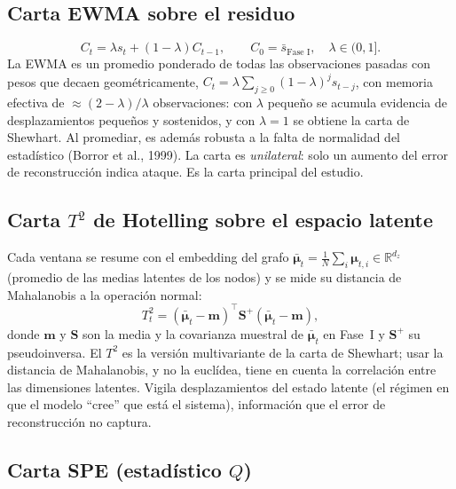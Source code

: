 \documentclass[11pt,a4paper]{article}
\newcommand{\R}{\mathbb{R}}
\begin{document}
\subsection{Carta EWMA sobre el residuo}

\begin{equation}
C_t=\lambda s_t+(1-\lambda)C_{t-1},\qquad C_0=\bar s_{\text{Fase I}},\quad \lambda\in(0,1].
\end{equation}
La EWMA es un promedio ponderado de todas las observaciones pasadas con pesos que
decaen geométricamente, $C_t=\lambda\sum_{j\ge0}(1-\lambda)^j s_{t-j}$, con memoria
efectiva de $\approx(2-\lambda)/\lambda$ observaciones: con $\lambda$ pequeño se
acumula evidencia de desplazamientos pequeños y sostenidos, y con $\lambda=1$ se
obtiene la carta de Shewhart. Al promediar, es además robusta a la falta de
normalidad del estadístico (Borror et al., 1999). La carta es \emph{unilateral}: solo
un aumento del error de reconstrucción indica ataque. Es la carta principal del
estudio.

\subsection{Carta $T^2$ de Hotelling sobre el espacio latente}

Cada ventana se resume con el embedding del grafo
$\bar{\bm\mu}_t=\frac1N\sum_i\bm\mu_{t,i}\in\R^{d_z}$ (promedio de las medias
latentes de los nodos) y se mide su distancia de Mahalanobis a la operación normal:
\begin{equation}
T^2_t=(\bar{\bm\mu}_t-\mathbf{m})^\top\mathbf{S}^{+}(\bar{\bm\mu}_t-\mathbf{m}),
\end{equation}
donde $\mathbf{m}$ y $\mathbf{S}$ son la media y la covarianza muestral de
$\bar{\bm\mu}_t$ en Fase~I y $\mathbf{S}^{+}$ su pseudoinversa. El $T^2$ es la
versión multivariante de la carta de Shewhart; usar la distancia de Mahalanobis, y no
la euclídea, tiene en cuenta la correlación entre las dimensiones latentes. Vigila
desplazamientos del estado latente (el régimen en que el modelo ``cree'' que está el
sistema), información que el error de reconstrucción no captura.

\subsection{Carta SPE (estadístico $Q$)}
\end{document}

